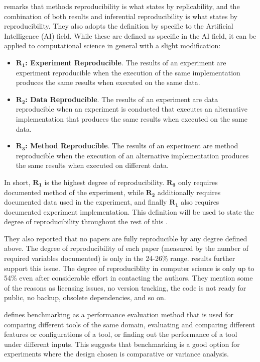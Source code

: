 \citet{gundersenStateArtReproducibility2018} remarks that methods reproducibility is what \citet{drummondReplicabilityNotReproducibility2009} states by replicability, and the combination of both results and inferential reproducibility is what \citet{drummondReplicabilityNotReproducibility2009} states by reproducibility.
They also adopts the definition by \citet{goodmanWhatDoesResearch2016} specific to the Artificial Intelligence (AI) field.
While these are defined as specific in the AI field, it can be applied to computational science in general with a slight modification:
\begin{itemize}
	\item \textbf{$\bm{R_1}$: Experiment Reproducible}. The results of an experiment are experiment reproducible when the execution of the same implementation produces the same results when executed on the same data.
	\item \textbf{$\bm{R_2}$: Data Reproducible}. The results of an experiment are data reproducible when an experiment is conducted that executes an alternative implementation that produces the same results when executed on the same data.
	\item \textbf{$\bm{R_3}$: Method Reproducible}. The results of an experiment are method reproducible when the execution of an alternative implementation produces the same results when executed on different data.
\end{itemize}

In short, $\bm{R_1}$ is the highest degree of reproducibility.
$\bm{R_3}$ only requires documented method of the experiment, while $\bm{R_2}$ additionally requires documented data used in the experiment, and finally $\bm{R_1}$ also requires documented experiment implementation.
This definition will be used to state the degree of reproducibility throughout the rest of this \MakeLowercase{\type}.

They also reported that no papers are fully reproducible by any degree defined above.
The degree of reproducibility of each paper (measured by the number of required variables documented) is only in the 24-26\% range.
\citet{collbergRepeatabilityComputerSystems2016} results further support this issue.
The degree of reproduciblity in computer science is only up to 54\% even after considerable effort in contacting the authors.
They mention some of the reasons as licensing issues, no version tracking, the code is not ready for public, no backup, obsolete dependencies, and so on.

\citet{beyerReliableBenchmarkingRequirements2019} defines benchmarking as a performance evaluation method that is used for comparing different tools of the same domain, evaluating and comparing different features or configurations of a tool, or finding out the performance of a tool under different inputs.
This suggests that benchmarking is a good option for experiments where the design chosen is comparative or variance analysis.

